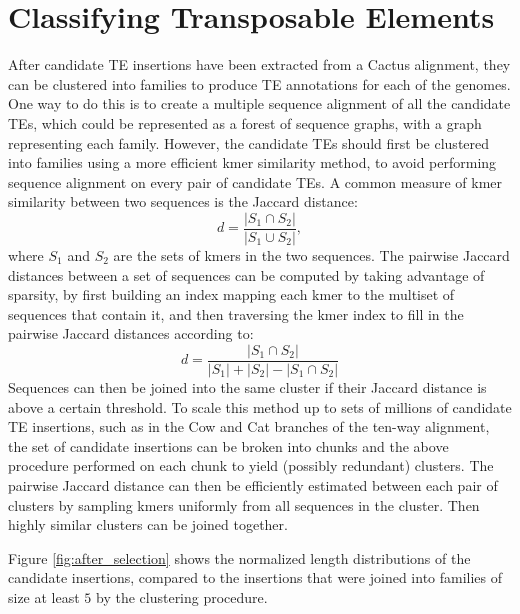 \documentclass{article}
\begin{document}
\section{Classifying Transposable Elements}

After candidate TE insertions have been extracted from a Cactus alignment, they can be clustered into families to produce TE annotations for each of the genomes. One way to do this is to create a multiple sequence alignment of all the candidate TEs, which could be represented as a forest of sequence graphs, with a graph representing each family. However, the candidate TEs should first be clustered into families using a more efficient kmer similarity method, to avoid performing sequence alignment on every pair of candidate TEs. A common measure of kmer similarity between two sequences is the Jaccard distance:
\begin{equation}
  d = \frac{|S_1 \cap S_2|}{|S_1 \cup S_2|},
\end{equation}
where $S_1$ and $S_2$ are the sets of kmers in the two sequences. The pairwise Jaccard distances between a set of sequences can be computed by taking advantage of sparsity, by first building an index mapping each kmer to the multiset of sequences that contain it, and then traversing the kmer index to fill in the pairwise Jaccard distances according to:
\begin{equation}
  d = \frac{|S_1 \cap S_2|}{|S_1| + |S_2| - |S_1 \cap S_2|}
\end{equation}
Sequences can then be joined into the same cluster if their Jaccard distance is above a certain threshold. To scale this method up to sets of millions of candidate TE insertions, such as in the Cow and Cat branches of the ten-way alignment, the set of candidate insertions can be broken into chunks and the above procedure performed on each chunk to yield (possibly redundant) clusters. The pairwise Jaccard distance can then be efficiently estimated between each pair of clusters by sampling kmers uniformly from all sequences in the cluster. Then highly similar clusters can be joined together.

Figure \ref{fig:after_selection} shows the normalized length distributions of the candidate insertions, compared to the insertions that were joined into families of size at least $5$ by the clustering procedure.
\end{document}
